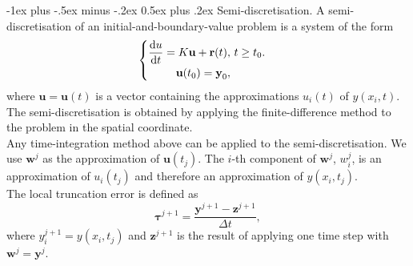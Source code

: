 \documentclass[10pt,landscape,a4paper]{article}
\makeatletter
\renewcommand{\section}{\@startsection{section}{1}{0mm}%
	{-1ex plus -.5ex minus -.2ex}%
	{0.5ex plus .2ex}%
	{\normalfont\large\bfseries}}
\makeatother
\begin{document}
\begin{multicols}{3}
		\section{Semi-discretisation.}
		A semi-discretisation of an initial-and-boundary-value problem is a system of the form
		\[
			\begin{cases}
				\begin{aligned}
					\dv{u}{t}=K\textbf{u}+\textbf{r}(t),&\ t\geq t_0.\\
					\textbf{u}(t_0)=\textbf{y}_0,&
				\end{aligned}
			\end{cases}
		\]
		where $ \textbf{u}=\textbf{u}(t) $ is a vector containing the approximations $ u_i(t) $ of $ y(x_i,t) $.\\
		The semi-discretisation is obtained by applying the finite-difference method to the problem in the spatial coordinate.\\
		Any time-integration method above can be applied to the semi-discretisation. We use $ \textbf{w}^j $ as the approximation of $ \textbf{u}(t_j) $.
		The $ i $-th component of $ \textbf{w}^j $, $ w_i^j $, is an approximation of $ u_i(t_j) $ and therefore an approximation of $ y(x_i,t_j) $.\\
		The local truncation error is defined as
		\[
			\bm{\tau}^{j+1}=\frac{\textbf{y}^{j+1}-\textbf{z}^{j+1}}{\Delta t},
		\]
		where $ y_i^{j+1}=y(x_i,t_j) $ and $ \textbf{z}^{j+1} $ is the result of applying one time step with $ \textbf{w}^j=\textbf{y}^j $.
		
		
		
		\newpage
	\end{multicols}
\end{document}
